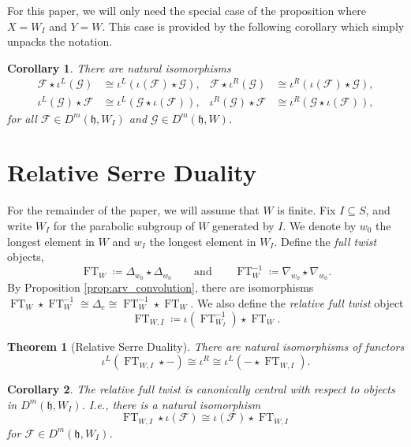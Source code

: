 \documentclass{amsart}
\newcommand{\scrF}{\mathcal{F}}
\newcommand{\scrG}{\mathcal{G}}
\newcommand{\BE}{D^m}
\newcommand{\fr}[1]{\mathfrak{#1}}
\newtheorem{corollary}{Corollary}[section]
\newtheorem{theorem}{Theorem}[section]
\theoremstyle{definition}
\DeclareMathOperator{\FT}{FT}
\begin{document}
        For this paper, we will only need the special case of the proposition where $X = W_I$ and $Y = W$. This case is provided by the following corollary which simply unpacks the notation.

        \begin{corollary}\label{cor:par_linearity}
               There are natural isomorphisms
                   \begin{align*}
                \scrF \star \iota^L (\scrG) &\cong \iota^L (\iota (\scrF) \star \scrG), & \scrF \star \iota^R (\scrG) &\cong \iota^R (\iota (\scrF) \star \scrG), \\
                \iota^L (\scrG) \star \scrF &\cong \iota^L (\scrG \star \iota (\scrF)), & \iota^R (\scrG) \star \scrF &\cong \iota^R (\scrG \star \iota (\scrF)),
        \end{align*}
        for all $\scrF \in \BE (\fr{h}, W_I)$ and $\scrG \in \BE (\fr{h}, W)$.
        \end{corollary}

        \section{Relative Serre Duality}

        For the remainder of the paper, we will assume that $W$ is finite.
        Fix $I \subseteq S$, and write $W_I$ for the parabolic subgroup of $W$ generated by $I$. 
        We denote by $w_0$ the longest element in $W$ and $w_I$ the longest element in $W_I$.
        Define the \emph{full twist} objects,
        \[ \FT_W \coloneq \Delta_{w_0} \star \Delta_{w_0} \qquad\text{and}\qquad \FT_W^{-1} \coloneq \nabla_{w_0} \star \nabla_{w_0}.\]
        By Proposition \ref{prop:arv_convolution}, there are isomorphisms $\FT_W \star \FT_W^{-1} \cong \Delta_e \cong \FT_W^{-1} \star \FT_W$.
        We also define the \emph{relative full twist} object 
        \[ \FT_{W, I} \coloneq \iota (\FT_{W_I}^{-1}) \star \FT_W. \]

        \begin{theorem}[Relative Serre Duality]\label{thm:rel_serre_duality}
                There are natural isomorphisms of functors 
                \[\iota^L (\FT_{W, I} \star -) \cong  \iota^R \cong \iota^L (- \star \FT_{W, I}).\]
        \end{theorem}

        \begin{corollary}\label{cor:rel_full_twist_centrality}
                The relative full twist is canonically central with respect to objects in $\BE (\fr{h}, W_I)$. 
                I.e., there is a natural isomorphism
                \[\FT_{W, I} \star \iota (\scrF) \cong \iota (\scrF) \star \FT_{W, I}\]
                for $\scrF \in \BE (\fr{h}, W_I)$.
        \end{corollary}
\end{document}

